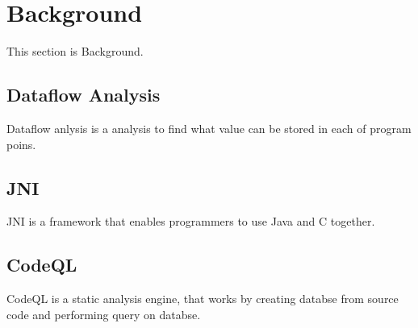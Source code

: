 \section{Background}
This section is Background.

\subsection{Dataflow Analysis}
Dataflow anlysis is a analysis to find what value can be stored in each of
program poins.

\subsection{JNI}
JNI is a framework that enables programmers to use Java and C together.

\subsection{CodeQL}
CodeQL is a static analysis engine, that works by creating databse from
source code and performing query on databse.
